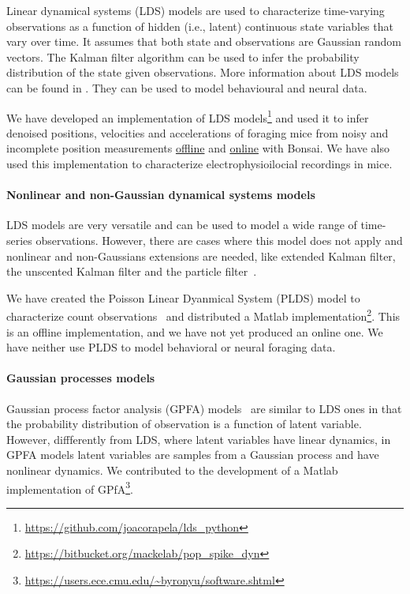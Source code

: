 Linear dynamical systems (LDS) models are used to characterize time-varying
observations as a function of hidden (i.e., latent) continuous state variables
that vary over time. It assumes that both state and observations are Gaussian
random vectors. The Kalman filter algorithm can be used to infer the
probability distribution of the state given observations. More information
about LDS models can be found in \citep[][part I]{durbinAndKoopman12}. They can
be used to model behavioural and neural data.

We have developed an implementation of LDS
models\footnote{\url{https://github.com/joacorapela/lds\_python}} and used it to infer denoised
positions, velocities and accelerations of foraging mice from noisy and
incomplete position measurements
\href{https://joacorapela.github.io/lds\_python/auto\_examples/tracking/plotFilterFWGMouseTrajectoryManualVsLearnedParams.html}{offline}
and
\href{https://bonsai-rx.org/machinelearning/examples/examples/LinearDynamicalSystems/Kinematics/ForagingMouse/README.html}{online}
with Bonsai.
%
We have also used this implementation to characterize electrophysioilocial recordings in mice.

\paragraph{Nonlinear and non-Gaussian dynamical systems models}

LDS models are very versatile and can be used to model a wide range of
time-series observations. However, there are cases where this model does not
apply and nonlinear and non-Gaussians extensions are needed, like extended
Kalman filter, the unscented Kalman filter and the particle
filter~\citep[][part II]{durbinAndKoopman12}.

We have created the Poisson Linear Dyanmical System (PLDS) model to characterize count
observations~\citep{mackeEtAl15} and distributed a Matlab
implementation\footnote{\url{https://bitbucket.org/mackelab/pop\_spike\_dyn}}.
This is an offline implementation, and we have not yet produced an online one.
We have neither use PLDS to model behavioral or neural foraging data.

\paragraph{Gaussian processes models}

Gaussian process factor analysis (GPFA) models~\citep{yuEtAl09} are similar to
LDS ones in that the probability distribution of observation is a function of
latent variable. However, diffferently from LDS, where latent variables have
linear dynamics, in GPFA models latent variables are samples from a Gaussian
process and have nonlinear dynamics. We contributed to the development of a
Matlab implementation of
GPfA\footnote{\url{https://users.ece.cmu.edu/~byronyu/software.shtml}}.

